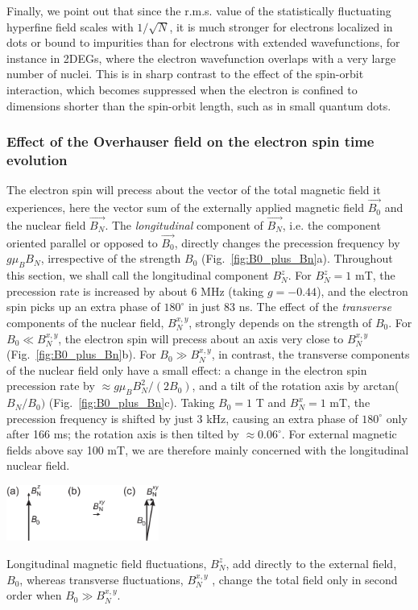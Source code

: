 \documentclass[rmp,twocolumn,aps]{revtex4}
\begin{document}
Finally, we point out that since the r.m.s. value of the statistically fluctuating hyperfine field scales with $1/\sqrt{N}$, it is much stronger for electrons localized in dots or bound to impurities than for electrons with extended wavefunctions, for instance in 2DEGs, where the electron wavefunction overlaps with a very large number of nuclei. This is in sharp contrast to the effect of the spin-orbit interaction, which becomes suppressed when the electron is confined to dimensions shorter than the spin-orbit length, such as in small quantum dots.


\subsubsection{Effect of the Overhauser field on the electron spin time evolution}
\label{sec:effect_BN}

The electron spin will precess about the vector of the total
magnetic field it experiences, here the vector sum of the
externally applied magnetic field $\vec{B_0}$ and the nuclear
field $\vec{B_N}$. The \emph{longitudinal} component of
$\vec{B_N}$, i.e. the component oriented parallel or opposed to
$\vec{B_0}$, directly changes the precession frequency by $g \mu_B
B_N$, irrespective of the strength $B_0$
(Fig.~\ref{fig:B0_plus_Bn}a). Throughout this section, we shall
call the longitudinal component $B_N^z$. For $B_N^z = 1$ mT, the
precession rate is increased by about 6 MHz (taking $g=-0.44$), and the electron spin picks up an extra phase of $180^\circ$ in just 83 ns. The effect of the \emph{transverse} components of the nuclear field,
$B_N^{x,y}$, strongly depends on the strength of $B_0$. For $B_0
\ll B_N^{x,y}$, the electron spin will precess about an axis
very close to $B_N^{x,y}$ (Fig.~\ref{fig:B0_plus_Bn}b). For $B_0
\gg B_N^{x,y}$, in contrast, the transverse components of the
nuclear field only have a small effect: a change in the electron
spin precession rate by $\approx g \mu_B B_N^2/(2 B_0)$, and a
tilt of the rotation axis by arctan($B_N/B_0)$
(Fig.~\ref{fig:B0_plus_Bn}c). Taking $B_0 = 1$ T and $B_N^x = 1$
mT, the precession frequency is shifted by just 3 kHz, causing an
extra phase of $180^\circ$ only after 166 ms; the rotation axis is
then tilted by $\approx 0.06^\circ$. For external magnetic fields
above say 100 mT, we are therefore mainly concerned with the
longitudinal nuclear field.

\bfig
\begin{center}
\includegraphics[width=5cm]{hanson_fig25.eps}
\end{center}
\caption{Longitudinal magnetic field fluctuations, $B_N^z$, add
directly to the external field, $B_0$, whereas transverse
fluctuations, $B_N^{x,y}$ , change the total field only in second
order when $B_0 \gg B_N^{x,y}$.} 
\label{fig:B0_plus_Bn} 
\efig
\end{document}
